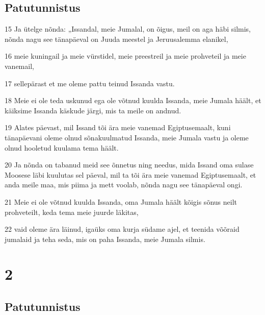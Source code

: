 \section*{Patutunnistus}

\par 15 Ja ütelge nõnda: „Issandal, meie Jumalal, on õigus, meil on aga häbi silmis, nõnda nagu see tänapäeval on Juuda meestel ja Jeruusalemma elanikel,
\par 16 meie kuningail ja meie vürstidel, meie preestreil ja meie prohveteil ja meie vanemail,
\par 17 sellepärast et me oleme pattu teinud Issanda vastu.
\par 18 Meie ei ole teda uskunud ega ole võtnud kuulda Issanda, meie Jumala häält, et käiksime Issanda käskude järgi, mis ta meile on andnud.
\par 19 Alates päevast, mil Issand tõi ära meie vanemad Egiptusemaalt, kuni tänapäevani oleme olnud sõnakuulmatud Issanda, meie Jumala vastu ja oleme olnud hooletud kuulama tema häält.
\par 20 Ja nõnda on tabanud meid see õnnetus ning needus, mida Issand oma sulase Moosese läbi kuulutas sel päeval, mil ta tõi ära meie vanemad Egiptusemaalt, et anda meile maa, mis piima ja mett voolab, nõnda nagu see tänapäeval ongi.
\par 21 Meie ei ole võtnud kuulda Issanda, oma Jumala häält kõigis sõnus neilt prohveteilt, keda tema meie juurde läkitas,
\par 22 vaid oleme ära läinud, igaüks oma kurja südame ajel, et teenida võõraid jumalaid ja teha seda, mis on paha Issanda, meie Jumala silmis.

\chapter{2}

\section*{Patutunnistus}


